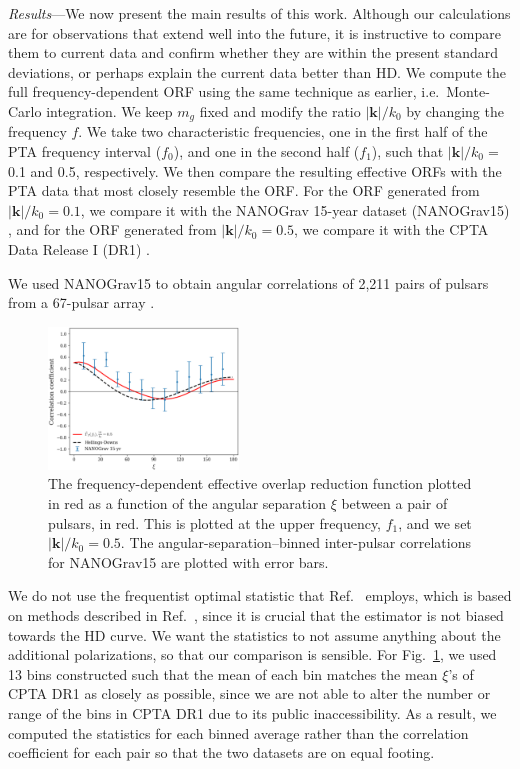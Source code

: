 \documentclass[prd,twocolumn,aps,psfig,nofootinbib,nobibnotes,superscriptaddress,preprintnumbers,times]{revtex4-2}
\begin{document}
\textit{Results}---We now present the main results of this work. Although our calculations are for observations that extend well into the future, it is instructive to compare them to current data and confirm whether they are within the present standard deviations, or perhaps explain the current data better than HD. We compute the full frequency-dependent ORF using the same technique as earlier, i.e.~Monte-Carlo integration. We keep $m_g$ fixed and modify the ratio $|\boldsymbol{k}|/k_0$ by changing the frequency $f$. We take two characteristic frequencies, one in the first half of the PTA frequency interval ($f_0$), and one in the second half ($f_1$), such that $|\boldsymbol{k}|/k_0 =$ 0.1 and 0.5, respectively. We then compare the resulting effective ORFs with the PTA data that most closely resemble the ORF. For the ORF generated from $|\boldsymbol{k}|/k_0 = 0.1$, we compare it with the NANOGrav 15-year dataset (NANOGrav15) \cite{Agazie:2023}, and for the ORF generated from $|\boldsymbol{k}|/k_0 = 0.5$, we compare it with the CPTA Data Release I (DR1) \cite{Xu:2023wog}.

We used NANOGrav15 to obtain angular correlations of 2,211 pairs of pulsars from a 67-pulsar array \cite{Agazie:2023}. 
\begin{figure}[ht]
    \centering
    \includegraphics[width=0.45\textwidth]{fig2.pdf}
    \caption{The frequency-dependent effective overlap reduction function plotted in red as a function of the angular separation $\xi$ between a pair of pulsars, in red. This is plotted at the upper frequency, $f_1$, and we set $|\boldsymbol{k}|/k_0 = 0.5$. The angular-separation–binned inter-pulsar correlations for NANOGrav15 are plotted with error bars.}
    \label{fig:ng}
\end{figure}
We do not use the frequentist optimal statistic that Ref.~\cite{Agazie:2023} employs, which is based on methods described in Ref.~\cite{Allen:2022ksj}, since it is crucial that the estimator is not biased towards the HD curve. We want the statistics to not assume anything about the additional polarizations, so that our comparison is sensible. For Fig.~\ref{fig:ng}, we used 13 bins constructed such that the mean of each bin matches the mean $\xi$'s of CPTA DR1 as closely as possible, since we are not able to alter the number or range of the bins in CPTA DR1 due to its public inaccessibility. As a result, we computed the statistics for each binned average rather than the correlation coefficient for each pair so that the two datasets are on equal footing. 
\end{document}
